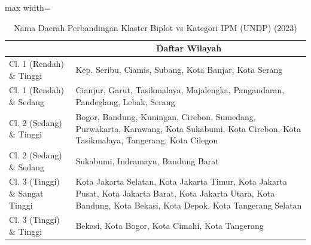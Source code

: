 \begin{table}[H]
\centering
\caption{Nama Daerah Perbandingan Klaster Biplot vs Kategori IPM (UNDP) (2023)} \label{tab:app2crossname2023}
\begin{adjustbox}{max width=\textwidth}
\begin{tabular}{|>{\centering\arraybackslash}p{4cm}|p{10cm}|}
\hline
\multicolumn{1}{|c|}{\textbf{Kategori}} & \multicolumn{1}{c|}{\textbf{Daftar Wilayah}} \\
\hline
Cl. 1 (Rendah) \& Tinggi & Kep. Seribu, Ciamis, Subang, Kota Banjar, Kota Serang \\
\hline
Cl. 1 (Rendah) \& Sedang & Cianjur, Garut, Tasikmalaya, Majalengka, Pangandaran, Pandeglang, Lebak, Serang \\
\hline
Cl. 2 (Sedang) \& Tinggi & Bogor, Bandung, Kuningan, Cirebon, Sumedang, Purwakarta, Karawang, Kota Sukabumi, Kota Cirebon, Kota Tasikmalaya, Tangerang, Kota Cilegon \\
\hline
Cl. 2 (Sedang) \& Sedang & Sukabumi, Indramayu, Bandung Barat \\
\hline
Cl. 3 (Tinggi) \& Sangat Tinggi & Kota Jakarta Selatan, Kota Jakarta Timur, Kota Jakarta Pusat, Kota Jakarta Barat, Kota Jakarta Utara, Kota Bandung, Kota Bekasi, Kota Depok, Kota Tangerang Selatan \\
\hline
Cl. 3 (Tinggi) \& Tinggi & Bekasi, Kota Bogor, Kota Cimahi, Kota Tangerang \\
\hline
\end{tabular}
\end{adjustbox}
\end{table}